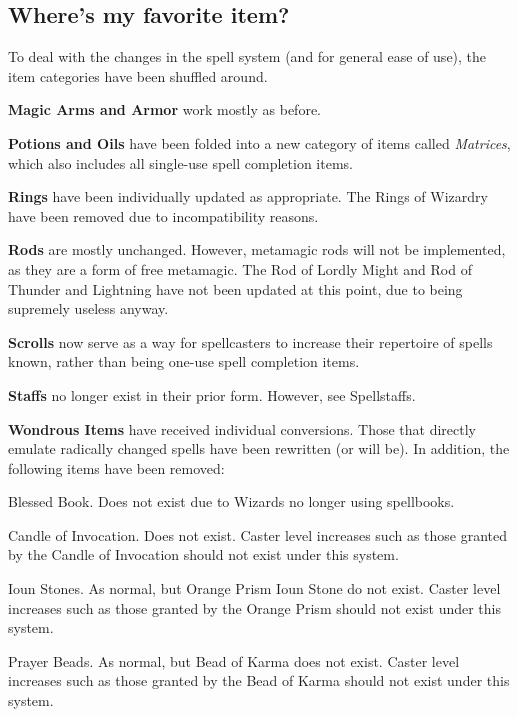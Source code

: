 \subsection{Where's my favorite item?}
\label{sec:MissingItems}
To deal with the changes in the spell system (and for general ease of use), the item categories have been shuffled around.
\begin{list}{}{\leftmargin=1em}
 \item \textbf{Magic Arms and Armor} work mostly as before.
 \item \textbf{Potions and Oils} have been folded into a new category of items called \emph{Matrices}, which also includes all single-use spell completion items.
 \item \textbf{Rings} have been individually updated as appropriate. The Rings of Wizardry have been removed due to incompatibility reasons.
 \item \textbf{Rods} are mostly unchanged. However, metamagic rods will not be implemented, as they are a form of free metamagic. The Rod of Lordly Might and Rod of Thunder and Lightning have not been updated at this point, due to being supremely useless anyway.
 \item \textbf{Scrolls} now serve as a way for spellcasters to increase their repertoire of spells known, rather than being one-use spell completion items.
 \item \textbf{Staffs} no longer exist in their prior form. However, see Spellstaffs.
 \item \textbf{Wondrous Items} have received individual conversions. Those that directly emulate radically changed spells have been rewritten (or will be). In addition, the following items have been removed:
 \begin{list}{}{\leftmargin=1em}
  \item Blessed Book. Does not exist due to Wizards no longer using spellbooks.
  \item Candle of Invocation. Does not exist. Caster level increases such as those granted by the Candle of Invocation should not exist under this system.
  \item Ioun Stones. As normal, but Orange Prism Ioun Stone do not exist. Caster level increases such as those granted by the Orange Prism should not exist under this system.
  \item Prayer Beads. As normal, but Bead of Karma does not exist. Caster level increases such as those granted by the Bead of Karma should not exist under this system.
  \item 
 \end{list}
\end{list}
